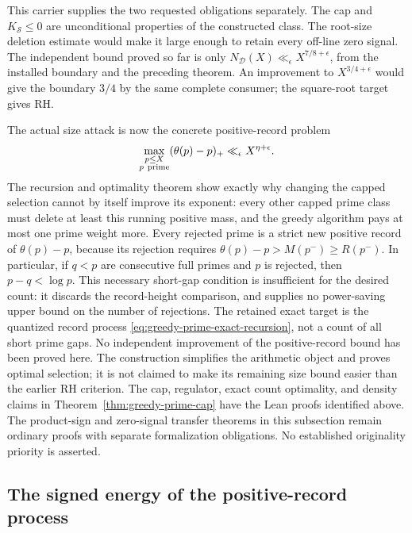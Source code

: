 \documentclass[11pt]{article}
\theoremstyle{definition}
\begin{document}
This carrier supplies the two requested obligations separately.
The cap and $K_{\mathcal S}\le0$ are unconditional properties
of the constructed class. The root-size deletion estimate
would make it large enough to retain every off-line zero signal.
The independent bound proved so far is only
$N_{\mathcal D}(X)\ll_\epsilon X^{7/8+\epsilon}$, from the
installed boundary and the preceding theorem.
An improvement to $X^{3/4+\epsilon}$ would give the boundary
$3/4$ by the same complete consumer; the square-root target gives RH.

The actual size attack is now the concrete positive-record problem
\[
 \max_{\substack{p\le X\\p\ {\rm prime}}}(\theta(p)-p)_+
                  \ll_\epsilon X^{\eta+\epsilon}.
\]
The recursion and optimality theorem show exactly why changing
the capped selection cannot by itself improve its exponent:
every other capped prime class must delete at least this
running positive mass, and the greedy algorithm pays at most
one prime weight more. Every rejected prime is a strict new
positive record of $\theta(p)-p$, because its rejection requires
$\theta(p)-p>M(p^-)\ge R(p^-)$. In particular, if $q<p$
are consecutive full primes and $p$ is rejected, then
$p-q<\log p$. This necessary short-gap condition is insufficient
for the desired count: it discards the record-height comparison,
and supplies no power-saving upper bound on the number of
rejections. The retained exact target is the quantized record
process \eqref{eq:greedy-prime-exact-recursion}, not a count of
all short prime gaps. No independent improvement of the
positive-record bound has been proved here.
The construction simplifies the arithmetic object and proves
optimal selection; it is not claimed to make its remaining
size bound easier than the earlier RH criterion.
The cap, regulator, exact count optimality, and density claims in
Theorem~\ref{thm:greedy-prime-cap} have the Lean proofs identified above.
The product-sign and zero-signal transfer theorems in this subsection
remain ordinary proofs with separate formalization obligations.
No established originality priority is asserted.

\subsection{The signed energy of the positive-record process}
\label{sec:prime-record-energy}
\end{document}

